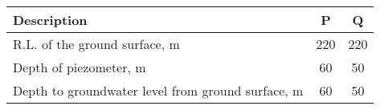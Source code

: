 \begin{center}
\begin{tabular}{|l|c|c|}
\hline
Description & \textbf{P} & \textbf{Q} \\
\hline
R.L. of the ground surface, m & 220 & 220 \\
Depth of piezometer, m & 60 & 50 \\
Depth to groundwater level from ground surface, m & 60 & 50 \\
\hline
\end{tabular}
\end{center}